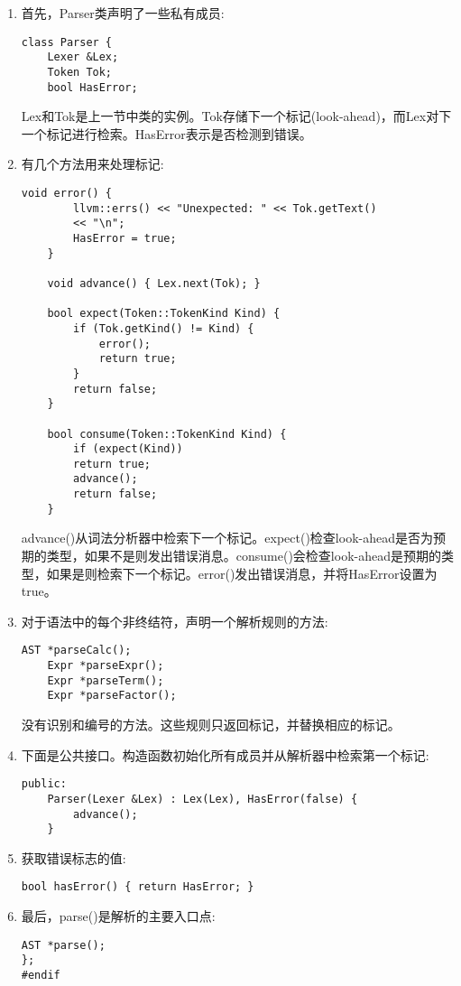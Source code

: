 \begin{enumerate}
\item 首先，Parser类声明了一些私有成员:
\begin{lstlisting}[caption={}]
class Parser {
	Lexer &Lex;
	Token Tok;
	bool HasError;
\end{lstlisting}
Lex和Tok是上一节中类的实例。Tok存储下一个标记(look-ahead)，而Lex对下一个标记进行检索。HasError表示是否检测到错误。

\item 有几个方法用来处理标记:
\begin{lstlisting}[caption={}]
	void error() {
		llvm::errs() << "Unexpected: " << Tok.getText()
		<< "\n";
		HasError = true;
	}
	
	void advance() { Lex.next(Tok); }
	
	bool expect(Token::TokenKind Kind) {
		if (Tok.getKind() != Kind) {
			error();
			return true;
		}
		return false;
	}
	
	bool consume(Token::TokenKind Kind) {
		if (expect(Kind))
		return true;
		advance();
		return false;
	}
\end{lstlisting}
advance()从词法分析器中检索下一个标记。expect()检查look-ahead是否为预期的类型，如果不是则发出错误消息。consume()会检查look-ahead是预期的类型，如果是则检索下一个标记。error()发出错误消息，并将HasError设置为true。\par

\item 对于语法中的每个非终结符，声明一个解析规则的方法:
\begin{lstlisting}[caption={}]
	AST *parseCalc();
	Expr *parseExpr();
	Expr *parseTerm();
	Expr *parseFactor();
\end{lstlisting}
\begin{tcolorbox}[colback=blue!5!white,colframe=blue!75!black, title=Note]
没有识别和编号的方法。这些规则只返回标记，并替换相应的标记。
\end{tcolorbox}

\item 下面是公共接口。构造函数初始化所有成员并从解析器中检索第一个标记:
\begin{lstlisting}[caption={}]
	public:
	Parser(Lexer &Lex) : Lex(Lex), HasError(false) {
		advance();
	}
\end{lstlisting}

\item 获取错误标志的值:
\begin{lstlisting}[caption={}]
	bool hasError() { return HasError; }
\end{lstlisting}

\item 最后，parse()是解析的主要入口点:
\begin{lstlisting}[caption={}]
	AST *parse();
};
#endif
\end{lstlisting}
	
\end{enumerate}

